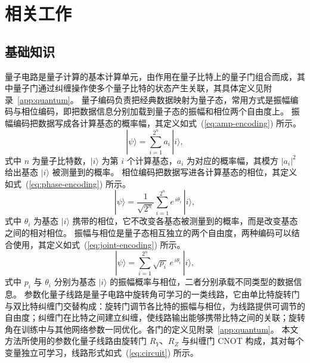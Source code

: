 
\section{相关工作}

\subsection{基础知识}

量子电路是量子计算的基本计算单元，由作用在量子比特上的量子门组合而成，其中量子门通过纠缠操作使多个量子比特的状态产生关联，其具体定义见附录~\ref{app:quantum}。
量子编码负责把经典数据映射为量子态，常用方式是振幅编码与相位编码，即把数据信息分别加载到量子态的振幅和相位两个自由度上。
振幅编码把数据写成各计算基态的概率幅，其定义如式~(\ref{eq:amp-encoding}) 所示。
\begin{equation}
\label{eq:amp-encoding}
|\psi\rangle = \sum_{i=1}^{2^n} a_i\,|i\rangle,
\end{equation}
式中 $n$ 为量子比特数，$|i\rangle$ 为第 $i$ 个计算基态，$a_i$ 为对应的概率幅，其模方 $|a_i|^2$ 给出基态 $|i\rangle$ 被测量到的概率。
相位编码把数据写进各计算基态的相位，其定义如式~(\ref{eq:phase-encoding}) 所示。
\begin{equation}
\label{eq:phase-encoding}
|\psi\rangle = \frac{1}{\sqrt{2^n}}\sum_{i=1}^{2^n} e^{\,i\theta_i}\,|i\rangle,
\end{equation}
式中 $\theta_i$ 为基态 $|i\rangle$ 携带的相位，它不改变各基态被测量到的概率，而是改变基态之间的相对相位。
振幅与相位是量子态相互独立的两个自由度，两种编码可以结合使用，其定义如式~(\ref{eq:joint-encoding}) 所示。
\begin{equation}
\label{eq:joint-encoding}
|\psi\rangle = \sum_{i=1}^{2^n} \sqrt{p_i}\,e^{\,i\theta_i}\,|i\rangle,
\end{equation}
式中 $p_i$ 与 $\theta_i$ 分别为基态 $|i\rangle$ 的振幅概率与相位，二者分别承载不同类型的数据信息。
参数化量子线路是量子电路中旋转角可学习的一类线路，它由单比特旋转门与双比特纠缠门交替构成：旋转门调节各比特的振幅与相位，为线路提供可调节的自由度；纠缠门在比特之间建立纠缠，使线路输出能够携带比特之间的关联；旋转角在训练中与其他网络参数一同优化。各门的定义见附录~\ref{app:quantum}。
本文方法所使用的参数化量子线路由旋转门 $R_Y$、$R_Z$ 与纠缠门 CNOT 构成，其对每个变量独立可学习，线路形式如式~(\ref{eq:circuit}) 所示。

